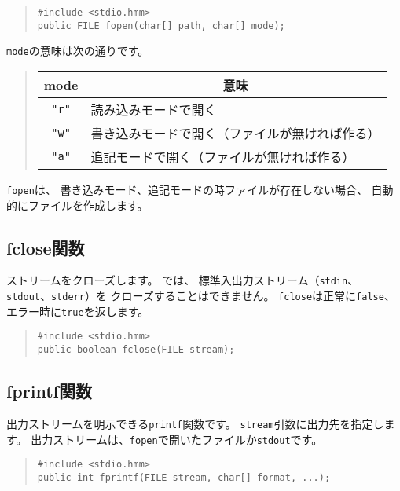 \begin{quote}
\begin{verbatim}
#include <stdio.hmm>
public FILE fopen(char[] path, char[] mode);
\end{verbatim}
\end{quote}

\verb/mode/の意味は次の通りです。

\begin{quote}
\begin{tabular}{c|l}
\multicolumn{1}{c|}{mode} & \multicolumn{1}{c}{意味} \\\hline
\verb/"r"/ & 読み込みモードで開く \\
\verb/"w"/ & 書き込みモードで開く（ファイルが無ければ作る） \\
\verb/"a"/ & 追記モードで開く（ファイルが無ければ作る）
\end{tabular}
\end{quote}

\verb/fopen/は、
書き込みモード、追記モードの時ファイルが存在しない場合、
自動的にファイルを作成します。

\subsection{fclose関数}

ストリームをクローズします。
\tacos では、
標準入出力ストリーム（\verb/stdin/、\verb/stdout/、\verb/stderr/）を
クローズすることはできません。
\verb/fclose/は正常に\verb/false/、
エラー時に\verb/true/を返します。

\begin{quote}
\begin{verbatim}
#include <stdio.hmm>
public boolean fclose(FILE stream);
\end{verbatim}
\end{quote}

\subsection{fprintf関数}

出力ストリームを明示できる\verb/printf/関数です。
\verb/stream/引数に出力先を指定します。
出力ストリームは、\verb/fopen/で開いたファイルか\verb/stdout/です。

\begin{quote}
\begin{verbatim}
#include <stdio.hmm>
public int fprintf(FILE stream, char[] format, ...);
\end{verbatim}
\end{quote}

